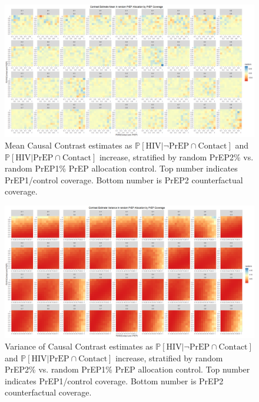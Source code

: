 \documentclass{article}
\theoremstyle{definition}
\begin{document}
\begin{figure}[H]
    \centering
    \includegraphics[width=\linewidth]{Figures/PrEP Random Mean Plots.png}
    \caption{Mean Causal Contrast estimates as $\mathbb{P}\left[\text{HIV} \vert \neg \text{PrEP} \cap \text{Contact}\right]$ and $\mathbb{P}\left[\text{HIV} \vert \text{PrEP} \cap \text{Contact}\right]$ increase, stratified by random PrEP2\% vs. random PrEP1\% PrEP allocation control. Top number indicates PrEP1/control coverage. Bottom number is PrEP2 counterfactual coverage.}
    \label{fig:Figure S4.13}
\end{figure}
\begin{figure}[H]
    \centering
    \includegraphics[width=\linewidth]{Figures/PrEP Random Variance Plots.png}
    \caption{Variance of Causal Contrast estimates as $\mathbb{P}\left[\text{HIV} \vert \neg \text{PrEP} \cap \text{Contact}\right]$ and $\mathbb{P}\left[\text{HIV} \vert \text{PrEP} \cap \text{Contact}\right]$ increase, stratified by random PrEP2\% vs. random PrEP1\% PrEP allocation control. Top number indicates PrEP1/control coverage. Bottom number is PrEP2 counterfactual coverage.}
    \label{fig:Figure S4.14}
\end{figure}
\end{document}
